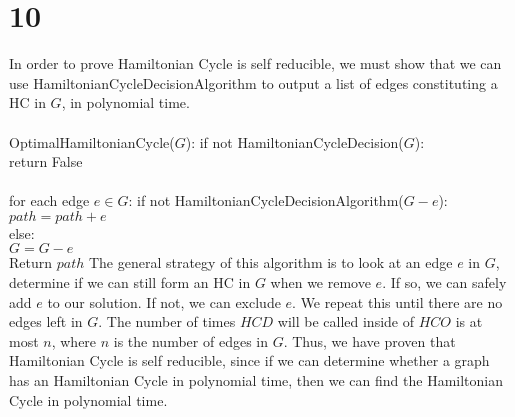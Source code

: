 \documentclass[letterpaper,notitlepage,twoside]{article}
\newcommand\tab[1][1cm]{\hspace*{#1}} %
\begin{document}
\section*{10}
In order to prove Hamiltonian Cycle is self reducible, we must show that we can use HamiltonianCycleDecisionAlgorithm to output a list of edges constituting a HC in $G$, in polynomial time.
\\\\
OptimalHamiltonianCycle($G$):
\tab if not HamiltonianCycleDecision($G$):\\
\tab\tab return False
\\\\
\tab for each edge $e \in G$:
\tab\tab if not HamiltonianCycleDecisionAlgorithm($G - e$):\\
\tab\tab\tab $path = path + e$\\
\tab\tab else:\\
\tab\tab\tab $G = G - e$\\
\tab Return $path$
The general strategy of this algorithm is to look at an edge $e$ in $G$, determine if we can still form an HC in $G$ when we remove $e$. If so, we can safely add $e$ to our solution. If not, we can exclude $e$. We repeat this until there are no edges left in $G$.
The number of times $HCD$ will be called inside of $HCO$ is at most $n$, where $n$ is the number of edges in $G$. Thus, we have proven that Hamiltonian Cycle is self reducible, since if we can determine whether a graph has an Hamiltonian Cycle in polynomial time, then we can find the Hamiltonian Cycle in polynomial time.  
\end{document}
